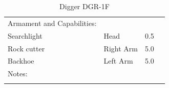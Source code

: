 \documentclass{tufte-book}
\begin{document}
\begin{table}
\begin{minipage}{\textwidth}
\begin{center}
\begin{tabular}{llll}
Armament and Capabilities: & & \\
\quad Searchlight & Head & 0.5 \\
\quad Rock cutter & Right Arm & 5.0 \\
\quad Backhoe & Left Arm & 5.0 \\

Notes: & & \\
\multicolumn{3}{l}{\quad } \\

\bottomrule
\end{tabular}
\end{center}
\end{minipage}
\caption{Digger DGR-1F}
\end{table}
\end{document}
